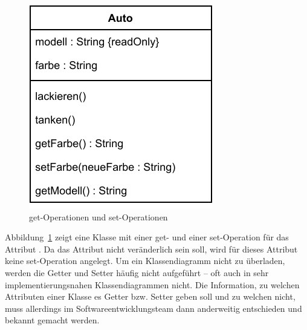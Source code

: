 \vspace{\baselineskip} %
\vspace{3mm} %

\begin{figure}[h!]
	\centering
	\includegraphics[scale=1.0]{Bilder/Kapitel-8/klasse_auto_getter_setter.pdf}
	\caption{get-Operationen und set-Operationen} %
	\label{fig:klasse_auto_getter_setter}
\end{figure}

\vspace{\baselineskip} %

Abbildung~\ref{fig:klasse_auto_getter_setter} zeigt eine Klasse  mit einer get- und einer set-Operation für das Attribut . Da das Attribut  nicht veränderlich sein soll, wird für dieses Attribut keine set-Operation angelegt. Um ein Klassendiagramm nicht zu überladen, werden die Getter und Setter häufig nicht aufgeführt – oft auch in sehr implementierungs\-nahen Klassendiagrammen nicht. Die Information, zu welchen Attri\-buten einer Klasse es Getter bzw. Setter geben soll und zu welchen nicht, muss allerdings im Softwareentwicklungsteam dann anderweitig entschieden und bekannt gemacht werden.

\vspace{2mm} %

